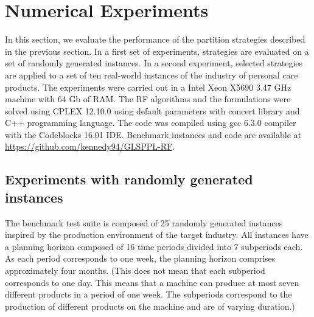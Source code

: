 \documentclass[11pt]{article}
\begin{document}
\section{Numerical Experiments} \label{secnum}

In this section, we evaluate the performance of the partition strategies described in the previous section. In a first set of experiments, strategies are evaluated on a set of randomly generated instances. In a second experiment, selected strategies are applied to a set of ten real-world instances of the industry of personal care products. The experiments were carried out in a Intel Xeon X5690 3.47 GHz machine with 64 Gb of RAM. The RF algorithms and the formulations were solved using CPLEX 12.10.0 using default parameters with concert library and C++ programming language. The code was compiled using gcc 6.3.0 compiler with the Codeblocks 16.01 IDE. Benchmark instances and code are available at \url{https://github.com/kennedy94/GLSPPL-RF}.

\subsection{Experiments with randomly generated instances}

The benchmark test suite is composed of 25 randomly generated instances inspired by the production environment of the target industry. All instances have a planning horizon composed of 16 time periods divided into 7 subperiods each. As each period corresponds to one week, the planning horizon comprises approximately four months. (This does not mean that each subperiod corresponds to one day. This means that a machine can produce at most seven different products in a period of one week. The subperiods correspond to the production of different products on the machine and are of varying duration.) 
\end{document}
